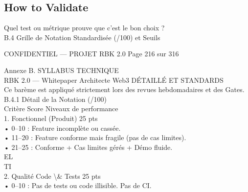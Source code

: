 \documentclass[12pt,landscape,a4paper]{article}
\newenvironment{confidential}
{\begin{tcolorbox}[
    colback=rbkred!5!white,
    colframe=rbkred!75!black,
    title=CONFIDENTIEL,
    fonttitle=\bfseries\color{white},
    coltitle=rbkred!75!black,
    breakable,
    enhanced,
    frame hidden,
    borderline west={2pt}{0pt}{rbkred!75!black}
]}
{\end{tcolorbox}}
\begin{document}
\subsection*{How to Validate}
Quel test ou métrique prouve que c'est le bon choix ?\\
\vspace{0.5em}
\vspace{0.5em}
\vspace{0.5em}
B.4 Grille de Notation Standardisée (/100) et Seuils\\
\vspace{0.5em}
\vspace{0.5em}
\begin{confidential}CONFIDENTIEL — PROJET RBK 2.0                       Page 216 sur 316\end{confidential}
Annexe B. SYLLABUS TECHNIQUE\\
RBK 2.0 — Whitepaper Architecte Web3                                                                         DÉTAILLÉ ET STANDARDS\\
\vspace{0.5em}
\vspace{0.5em}
\vspace{0.5em}
Ce barème est appliqué strictement lors des revues hebdomadaires et des Gates.\\
\vspace{0.5em}
\vspace{0.5em}
B.4.1 Détail de la Notation (/100)\\
\vspace{0.5em}
\vspace{0.5em}
Critère                           Score           Niveaux de performance\\
1. Fonctionnel (Produit)          25 pts\\
• 0–10 : Feature incomplète ou cassée.\\
• 11–20 : Feature conforme mais fragile (pas de cas limites).\\
• 21–25 : Conforme + Cas limites gérés + Démo fluide.\\
\vspace{0.5em}
\vspace{0.5em}
\vspace{0.5em}
\vspace{0.5em}
EL\\
TI\\
2. Qualité Code \textbackslash{}& Tests           25 pts\\
• 0–10 : Pas de tests ou code illisible. Pas de CI.\\
\end{document}
